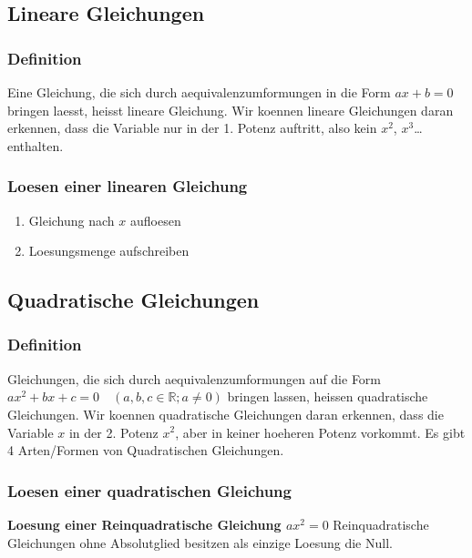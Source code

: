 \begin{multicols}{2}
    \subsection{Lineare Gleichungen}
    \vspace{-4mm}
    \subsubsection{Definition}
    \vspace{-4mm}
    Eine Gleichung, die sich durch aequivalenzumformungen in die Form $ax + b = 0$ bringen laesst, heisst lineare Gleichung. Wir koennen lineare Gleichungen daran erkennen, dass die Variable nur in der 1. Potenz auftritt, also kein $x^2$, $x^3$\dots enthalten.

    \subsubsection{Loesen einer linearen Gleichung}
    \begin{enumerate}
        \item Gleichung nach $x$ aufloesen
        \item Loesungsmenge aufschreiben
    \end{enumerate}

    \subsection{Quadratische Gleichungen}
    \vspace{-4mm}
    \subsubsection{Definition}
    \vspace{-4mm}
    Gleichungen, die sich durch aequivalenzumformungen auf die Form $ax^2 + bx + c = 0 \quad (a, b, c \in \mathbb{R}; a \neq 0)$
    bringen lassen, heissen quadratische Gleichungen. Wir koennen quadratische Gleichungen daran erkennen, dass die Variable $x$ in der 2. Potenz $x^2$, aber in keiner hoeheren Potenz vorkommt. Es gibt 4 Arten/Formen von Quadratischen Gleichungen.
    \subsubsection{Loesen einer quadratischen Gleichung}
    \vspace{-4mm}
    \textbf{Loesung einer Reinquadratische Gleichung $ax^2 = 0$}
    Reinquadratische Gleichungen ohne Absolutglied besitzen als einzige Loesung die Null.


\end{multicols}
